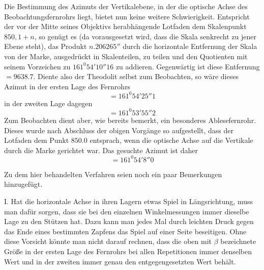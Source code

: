 Die Bestimmung des Azimuts der Vertikalebene, in der die optische Achse des Beobachtungsfernrohrs liegt, bietet nun keine weitere Schwierigkeit. Entspricht der vor der Mitte seines Objektivs herabhängende Lotfaden dem Skalenpunkt $850{,}1+n$, so genügt es (da vorausgesetzt wird, dass die Skala senkrecht zu jener Ebene steht), das Produkt $n.206265''$ durch die horizontale Entfernung der Skala von der Marke, ausgedrückt in Skalenteilen, zu teilen und den Quotienten mit seinem Vorzeichen zu $161^0 54'10''16$ zu addieren. Gegenwärtig ist diese Entfernung $=9638.7$. Diente also der Theodolit selbst zum Beobachten, so wäre dieses Azimut in der ersten Lage des Fernrohrs
\[
=161^0 54'25''1
\]
in der zweiten Lage dagegen
\[
=161^0 53'55''2
\]
Zum Beobachten dient aber, wie bereits bemerkt, ein besonderes Ablesefernrohr. Dieses wurde nach Abschluss der obigen Vorgänge so aufgestellt, dass der Lotfaden dem Punkt $850.0$ entsprach, wenn die optische Achse auf die Vertikale durch die Marke gerichtet war. Das gesuchte Azimut ist daher
\[
=161^0 54'8''0
\]

Zu dem hier behandelten Verfahren seien noch ein paar Bemerkungen hinzugefügt.

I. Hat die horizontale Achse in ihren Lagern etwas Spiel in Längsrichtung, muss man dafür sorgen, dass sie bei den einzelnen Winkelmessungen immer dieselbe Lage zu den Stützen hat. Dazu kann man jedes Mal durch leichten Druck gegen das Ende eines bestimmten Zapfens das Spiel auf einer Seite beseitigen. Ohne diese Vorsicht könnte man nicht darauf rechnen, dass die oben mit $\beta$ bezeichnete Größe in der ersten Lage des Fernrohrs bei allen Repetitionen immer denselben Wert und in der zweiten immer genau den entgegengesetzten Wert behält.

